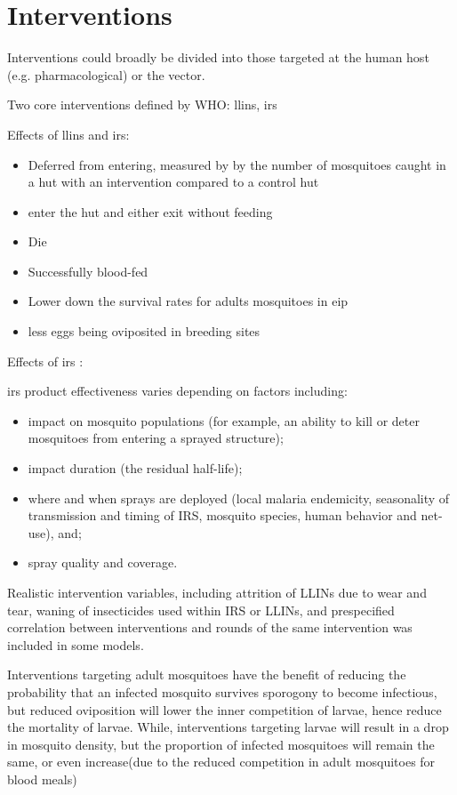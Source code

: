 \documentclass[a4paper, 12pt, twoside]{article}
\begin{document}
\section{Interventions}
Interventions could broadly be divided into those targeted at the human host (e.g. pharmacological) or the vector.

Two core interventions defined by WHO: \gls{llins}, \gls{irs}

Effects of \gls{llins} and \gls{irs}:

\begin{itemize}
	\item Deferred from entering, measured by by the number of mosquitoes caught in a hut with an intervention compared to a control hut
	\item enter the hut and either exit without feeding
	\item Die
	\item Successfully blood-fed
	\item Lower down the survival rates for adults mosquitoes in \gls{eip}
	\item less eggs being oviposited in breeding sites
\end{itemize}

Effects of \gls{irs} \cite{Sherrard-Smith2018b}:

\gls{irs} product effectiveness varies depending on factors including:

\begin{itemize}
	\item impact on mosquito populations (for example, an ability to kill or deter mosquitoes from entering a sprayed structure);
	\item impact duration (the residual half-life);
	\item where and when sprays are deployed (local malaria endemicity, seasonality of transmission and timing of IRS, mosquito species, human behavior and net-use), and;
	\item spray quality and coverage.
\end{itemize}

Realistic intervention variables, including attrition of LLINs due to wear and tear, waning of insecticides used within IRS or LLINs, and prespecified correlation between interventions and rounds of the same intervention was included in some models\cite{Walker2016}.

Interventions targeting adult mosquitoes have the benefit of reducing the probability that an infected mosquito survives sporogony to become infectious, but reduced oviposition will lower the inner competition of larvae, hence reduce the mortality of larvae.
While, interventions targeting larvae will result in a drop in mosquito density, but the proportion of infected mosquitoes will remain the same, or even increase(due to the reduced competition in adult mosquitoes for blood meals)
\end{document}
